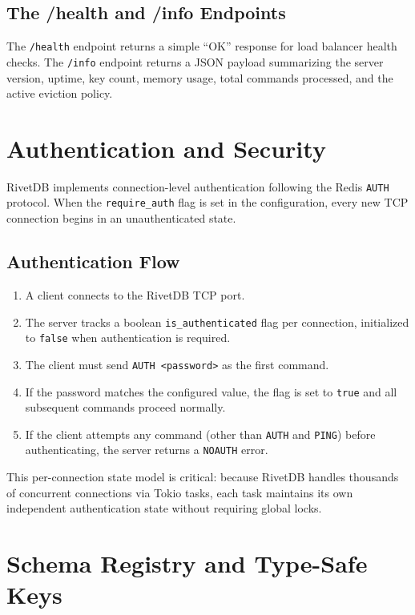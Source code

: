 \subsection{The /health and /info Endpoints}
The \texttt{/health} endpoint returns a simple ``OK'' response for load balancer health checks. The \texttt{/info} endpoint returns a JSON payload summarizing the server version, uptime, key count, memory usage, total commands processed, and the active eviction policy.

\section{Authentication and Security}

RivetDB implements connection-level authentication following the Redis \texttt{AUTH} protocol. When the \texttt{require\_auth} flag is set in the configuration, every new TCP connection begins in an unauthenticated state.

\subsection{Authentication Flow}
\begin{enumerate}[leftmargin=2.5em]
    \item A client connects to the RivetDB TCP port.
    \item The server tracks a boolean \texttt{is\_authenticated} flag per connection, initialized to \texttt{false} when authentication is required.
    \item The client must send \texttt{AUTH <password>} as the first command.
    \item If the password matches the configured value, the flag is set to \texttt{true} and all subsequent commands proceed normally.
    \item If the client attempts any command (other than \texttt{AUTH} and \texttt{PING}) before authenticating, the server returns a \texttt{NOAUTH} error.
\end{enumerate}

This per-connection state model is critical: because RivetDB handles thousands of concurrent connections via Tokio tasks, each task maintains its own independent authentication state without requiring global locks.

\section{Schema Registry and Type-Safe Keys}

